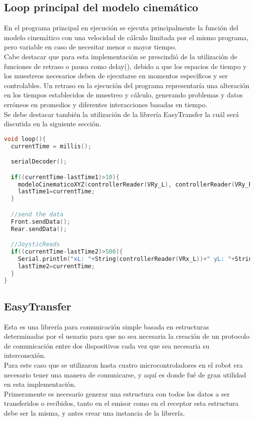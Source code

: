 \documentclass[12pt,letterpaper]{IEEEtran}
\begin{document}
\subsection*{Loop principal del modelo cinemático}
En el programa principal en ejecución se ejecuta principalmente la función del modelo cinemático con una velocidad de cálculo limitada por el mismo programa, pero variable en caso de necesitar menor o mayor tiempo.\\
Cabe destacar que para esta implementación se prescindió de la utilización de funciones de retraso o pausa como delay(), debido a que los espacios de tiempo y los muestreos necesarios deben de ejecutarse en momentos específicos y ser controlables. Un retraso en la ejecución del programa representaría una alteración en los tiempos establecidos de muestreo y cálculo, generando problemas y datos erróneos en promedios y diferentes interacciones basadas en tiempo.\\

Se debe destacar también la utilización de la librería EasyTransfer la cuál será discutida en la siguiente sección. \pagebreak

\begin{lstlisting}[language=c++]
void loop(){
  currentTime = millis();

  serialDecoder();

  if((currentTime-lastTime1)>10){
    modeloCinematicoXYZ(controllerReader(VRy_L), controllerReader(VRy_R), controllerReader(VRx_R));
    lastTime1=currentTime;
  }

  //send the data
  Front.sendData();
  Rear.sendData();

  //JoysticReads
  if((currentTime-lastTime2)>500){
    Serial.println("xL: "+String(controllerReader(VRx_L))+" yL: "+String(controllerReader(VRy_L))+" xR: "+String(controllerReader(VRx_R))+" yR: "+String(controllerReader(VRy_R)));
    lastTime2=currentTime;
  }
}
\end{lstlisting}

\subsection{EasyTransfer}
Esta es una librería para comunicación simple basada en estructuras determinadas por el usuario para que no sea necesaria la creación de un protocolo de comunicación entre dos dispositivos cada vez que sea necesaria su interconexión.\\
Para este caso que se utilizaron hasta cuatro microcontroladores en el robot era necesario tener una manera de comunicarse, y aquí es donde fué de gran utilidad en esta implementación.\\
Primeramente es necesario generar una estructura con todos los datos a ser transferidos o recibidos, tanto en el emisor como en el receptor esta estructura debe ser la misma, y antes crear una instancia de la librería.
\end{document}
